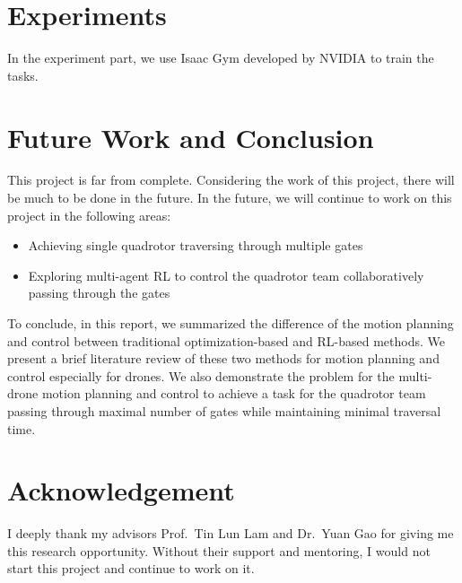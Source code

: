 \documentclass[letterpaper,journal,twoside]{IEEEtran}
\begin{document}
\section{Experiments}

In the experiment part, we use Isaac Gym \cite{makoviychuk2021isaac} developed by NVIDIA to train the tasks.

\section{Future Work and Conclusion}
This project is far from complete. 
Considering the work of this project, there will be much to be 
done in the future.
In the future, we will continue to work on this project in the 
following areas:
\begin{itemize}
  \item Achieving single quadrotor traversing through multiple gates
  \item Exploring multi-agent RL to control the quadrotor team collaboratively passing through the gates
\end{itemize}

To conclude, in this report, we summarized the difference 
of the motion planning and control between traditional optimization-based and RL-based methods. 
We present a brief literature review of these two methods for motion planning and control especially for drones.
We also demonstrate the problem for the multi-drone motion planning and control to achieve a task for the quadrotor team passing through maximal number of gates while maintaining minimal traversal time.

\section*{Acknowledgement}
I deeply thank my advisors Prof.~Tin Lun Lam and Dr.~Yuan Gao for giving me this research opportunity.
Without their support and mentoring, I would not start this project and continue to work on it.





\end{document}
